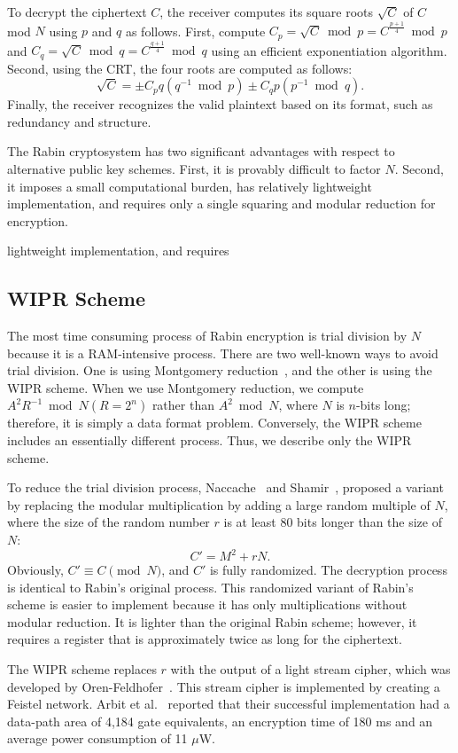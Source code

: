 \documentclass{article}
\begin{document}
To decrypt the ciphertext $C$, the receiver computes its square roots $\sqrt{C}$ 
of $C$ mod $N$ using $p$ and $q$ as follows.
First, compute 
$C_p = \sqrt{C}\bmod p = C^{\frac{p+1}{4}}\bmod p$ and 
$C_q = \sqrt{C}\bmod q = C^{\frac{q+1}{4}}\bmod q$
using an efficient exponentiation algorithm.
Second, using the CRT, 
the four roots are computed as follows:
$$
\sqrt{C}=
\pm C_p q(q^{-1}\bmod p)\pm C_q p(p^{-1}\bmod q).
$$
Finally, 
the receiver recognizes the valid plaintext based on its format, such as redundancy and structure.

The Rabin cryptosystem has two significant advantages with respect to 
alternative public key schemes. 
First, it is provably difficult to factor $N$. 
Second, it imposes a small computational burden, 
has relatively 
lightweight implementation, and requires only a single squaring and modular reduction 
for encryption.

lightweight implementation, and requires


\subsection{WIPR Scheme}
The most time consuming process of Rabin encryption is trial division by $N$ 
because it is a RAM-intensive process. 
There are two well-known ways to avoid trial division. 
One is using Montgomery reduction~\cite{Mont}, 
and the other is using the WIPR scheme.
When we use Montgomery reduction, we 
compute $A^2R^{-1} \bmod N(R=2^n)$ rather than $A^2 \bmod N$, 
where $N$ is $n$-bits long; therefore, it is simply a data format problem. 
Conversely, the WIPR scheme includes an essentially different process.
Thus, we describe only the WIPR scheme.

To reduce the trial division process, Naccache~\cite{Naccache} and Shamir~\cite{Shamir}, \cite{Shamir2} 
proposed a variant by replacing the modular multiplication by adding a large random multiple of $N$, 
where the size of the random number $r$ is at least 80 bits longer than the size of $N$:
$$
C' = M^2 + rN.
$$
Obviously, $C'\equiv C\pmod{N}$, and $C'$ is fully randomized.
The decryption process is identical to Rabin's original process.
This randomized variant of Rabin's scheme is easier to implement because it has only multiplications 
without modular reduction. 
It is lighter than the original Rabin scheme; however, it 
requires a register that is approximately twice as long 
for the ciphertext.

The WIPR scheme replaces $r$ with the output of a light stream cipher, 
which was developed by Oren-Feldhofer~\cite{Oren-Feldhofer}. 
This stream cipher is implemented by creating a Feistel network. 
Arbit et al.~\cite{Implement} reported that 
their successful implementation had a data-path area of 
4,184 gate equivalents, an encryption time of 180 ms and an average power consumption of 11 $\mu$W.  
\end{document}
